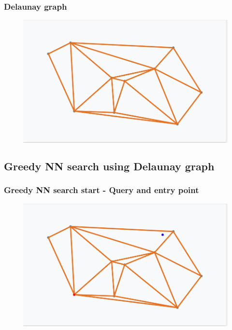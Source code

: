 \documentclass{beamer}
\begin{document}
  \begin{frame}
    \frametitle{Delaunay graph}  
  \begin{figure}[delaunay_graph]
    \vspace*{-0.1cm}
  	\includegraphics[scale=0.3]{delaunay_graph} 	
  \end{figure} 
  \end{frame} 
  
\subsection{Greedy NN search using Delaunay graph}

  \begin{frame}
    \frametitle{Greedy NN search start - Query and entry point}  
  \begin{figure}[greedy_search_start_new]
    \vspace*{-0.1cm}
  	\includegraphics[scale=0.3]{greedy_search_start_new} 	
  \end{figure} 
  \end{frame} 
  
\end{document}
